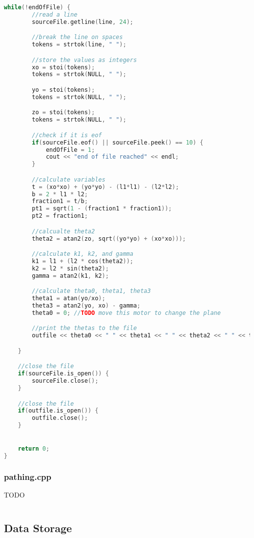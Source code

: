 \begin{lstlisting}[language=C++]
	while(!endOfFile) {
		//read a line
		sourceFile.getline(line, 24);

		//break the line on spaces
		tokens = strtok(line, " ");

		//store the values as integers
		xo = stoi(tokens);
		tokens = strtok(NULL, " ");

		yo = stoi(tokens);
		tokens = strtok(NULL, " ");

		zo = stoi(tokens);
		tokens = strtok(NULL, " ");

		//check if it is eof
		if(sourceFile.eof() || sourceFile.peek() == 10) {
			endOfFile = 1;
			cout << "end of file reached" << endl;
		}

		//calculate variables
		t = (xo*xo) + (yo*yo) - (l1*l1) - (l2*l2);
		b = 2 * l1 * l2;
		fraction1 = t/b;
		pt1 = sqrt(1 - (fraction1 * fraction1));
		pt2 = fraction1;

		//calcualte theta2
		theta2 = atan2(zo, sqrt((yo*yo) + (xo*xo)));

		//calculate k1, k2, and gamma
		k1 = l1 + (l2 * cos(theta2));
		k2 = l2 * sin(theta2);
		gamma = atan2(k1, k2);

		//calculate theta0, theta1, theta3
		theta1 = atan(yo/xo);
		theta3 = atan2(yo, xo) - gamma;
		theta0 = 0; //TODO move this motor to change the plane

		//print the thetas to the file
		outfile << theta0 << " " << theta1 << " " << theta2 << " " << theta3 << " " << endl;

	}

	//close the file
	if(sourceFile.is_open()) {
		sourceFile.close();
	}

	//close the file
	if(outfile.is_open()) {
		outfile.close();
	}


	return 0;
}
\end{lstlisting}

\subsubsection{pathing.cpp}
TODO
\begin{lstlisting}[language=C++]
\end{lstlisting}

\subsection{Data Storage}
